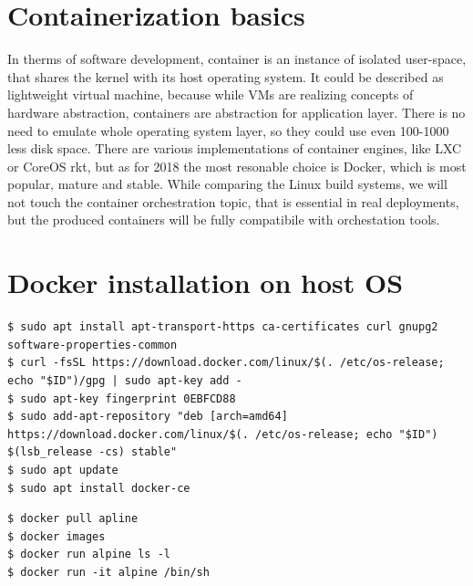 \documentclass[printmode]{mgr}
\begin{document}

\section{Containerization basics}


In therms of software development, container is an instance of isolated user-space, that shares the kernel with its host operating system.\cite{web:what-container}
It could be described as lightweight virtual machine, because while VMs are realizing concepts of hardware abstraction, containers are abstraction for application layer.
There is no need to emulate whole operating system layer, so they could use even 100-1000 less disk space.
There are various implementations of container engines, like LXC or CoreOS rkt, but as for 2018 the most resonable choice is Docker, which is most popular, mature and stable.\cite{web:why-docker}
While comparing the Linux build systems, we will not touch the container orchestration topic, that is essential in real deployments\cite{web:container-orchestration}, but the produced containers will be fully compatibile with orchestation tools.

\section{Docker installation on host OS}

\begin{lstlisting}
$ sudo apt install apt-transport-https ca-certificates curl gnupg2 software-properties-common
$ curl -fsSL https://download.docker.com/linux/$(. /etc/os-release; echo "$ID")/gpg | sudo apt-key add -
$ sudo apt-key fingerprint 0EBFCD88
$ sudo add-apt-repository "deb [arch=amd64] https://download.docker.com/linux/$(. /etc/os-release; echo "$ID") $(lsb_release -cs) stable"
$ sudo apt update
$ sudo apt install docker-ce
\end{lstlisting}


\begin{lstlisting}
$ docker pull apline
$ docker images
$ docker run alpine ls -l
$ docker run -it alpine /bin/sh
\end{lstlisting}
\end{document}
